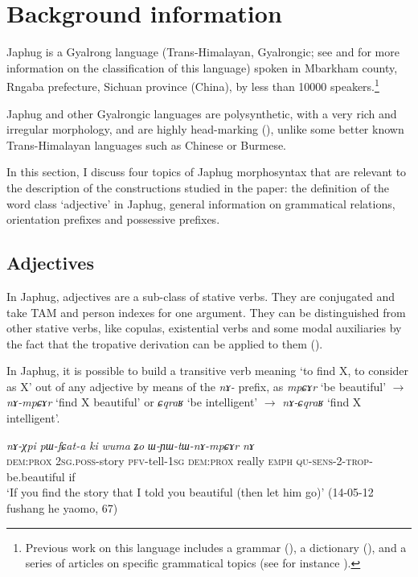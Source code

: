 \documentclass[oneside,a4paper,11pt]{article}
\newcommand{\ipa}[1]{{\phon\textit{#1}}}
\begin{document}
\section{Background information} \label{sec:background}
Japhug is a Gyalrong language (Trans-Himalayan, Gyalrongic; see \citealt{jackson00sidaba} and \citealt{jacques.michaud11naish} for more information on the classification of this language) spoken in Mbarkham county, Rngaba prefecture, Sichuan province (China), by less than 10000 speakers.\footnote{Previous work on this language includes a grammar (\citealt{jacques08}), a dictionary (\citealt{jacques15japhug}), and a series of articles on specific grammatical topics (see for instance \citealt{jacques13harmonization, jacques14linking, jacques16relatives}). } 


Japhug and other Gyalrongic languages are polysynthetic, with a very rich and irregular morphology, and are highly head-marking (\citealt{jacques13harmonization, jackson14morpho}), unlike some better known Trans-Himalayan languages such as Chinese or Burmese.

In this section, I discuss four topics of Japhug morphosyntax that are relevant to the description of the constructions studied in the paper: the definition of the word class `adjective' in Japhug, general information on grammatical relations, orientation prefixes and possessive prefixes.


\subsection{Adjectives}
In Japhug, adjectives are a sub-class of stative verbs. They are conjugated and take TAM and person indexes for one argument. They can be distinguished from other stative verbs, like copulas, existential verbs and some modal auxiliaries by the fact that the tropative derivation can be applied to them (\citealt{jacques13tropative}).

In Japhug, it is possible to build a transitive verb meaning `to find X, to consider as X' out of any adjective by means of the \ipa{nɤ-} prefix, as  \ipa{mpɕɤr} `be beautiful' $\rightarrow$ \ipa{nɤ-mpɕɤr} `find X beautiful' or \ipa{ɕqraʁ} `be intelligent' $\rightarrow$ \ipa{nɤ-ɕqraʁ} `find X intelligent'.

\begin{exe}
\ex \label{ex:WYWtWnAmpCAr}
\gll \ipa{kɯki}	\ipa{nɤ-χpi}	\ipa{pɯ-fɕat-a}	\ipa{ki}	\ipa{wuma}	\ipa{ʑo}	\ipa{ɯ-ɲɯ-tɯ-nɤ-mpɕɤr}	\ipa{nɤ} \\
\textsc{dem:prox} \textsc{2sg.poss}-story \textsc{pfv}-tell-\textsc{1sg} \textsc{dem:prox}  really \textsc{emph} \textsc{qu-sens}-2-\textsc{trop}-be.beautiful if \\
\glt `If you find the story that I told you beautiful (then let him go)' (14-05-12 fushang he yaomo, 67)
\end{exe}
\end{document}
